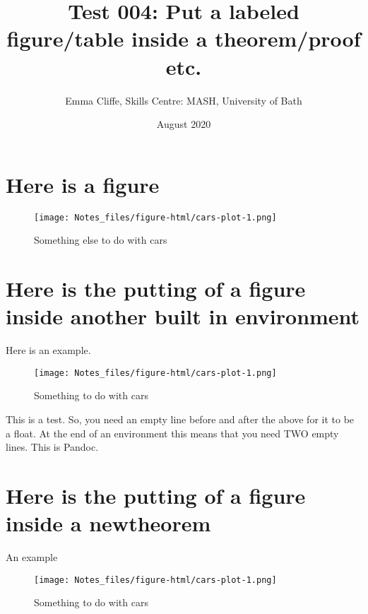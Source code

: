 \documentclass[
  17pt,
  a4paper]{extarticle}
\title{Test 004: Put a labeled figure/table inside a theorem/proof etc.}
\author{Emma Cliffe, Skills Centre: MASH, University of Bath}
\date{August 2020}
\theoremstyle{plain}
\theoremstyle{definition}
\theoremstyle{plain}
\theoremstyle{plain}
\theoremstyle{plain}
\theoremstyle{definition}
\theoremstyle{definition}
\theoremstyle{definition}
\theoremstyle{remark}
\theoremstyle{plain}
\let\BeginKnitrBlock\begin \let\EndKnitrBlock\end
\renewcommand{\;}{\,}
\begin{document}
\maketitle

{
\setcounter{tocdepth}{2}
\tableofcontents
}
\hypertarget{here-is-a-figure}{%
\section{Here is a figure}\label{here-is-a-figure}}

\begin{figure}
\centering
\texttt{[image: Notes\_files/figure-html/cars-plot-1.png]}
\caption{\label{fig:cars1}Something else to do with cars}
\end{figure}

\hypertarget{here-is-the-putting-of-a-figure-inside-another-built-in-environment}{%
\section{Here is the putting of a figure inside another built in environment}\label{here-is-the-putting-of-a-figure-inside-another-built-in-environment}}

\BeginKnitrBlock{example}
{\label{exm:unnamed-chunk-1} }Here is an example.

\begin{figure}
\centering
\texttt{[image: Notes\_files/figure-html/cars-plot-1.png]}
\caption{\label{fig:cars2}Something to do with cars}
\end{figure}

This is a test. So, you need an empty line before and after the above for it to be a float. At the end of an environment this means that you need TWO empty lines. This is Pandoc.
\EndKnitrBlock{example}

\hypertarget{here-is-the-putting-of-a-figure-inside-a-newtheorem}{%
\section{Here is the putting of a figure inside a newtheorem}\label{here-is-the-putting-of-a-figure-inside-a-newtheorem}}

\BeginKnitrBlock{Example*}
{}An example

\begin{figure}
\centering
\texttt{[image: Notes\_files/figure-html/cars-plot-1.png]}
\caption{\label{fig:cars3}Something to do with cars}
\end{figure}
\EndKnitrBlock{Example*}
\end{document}
